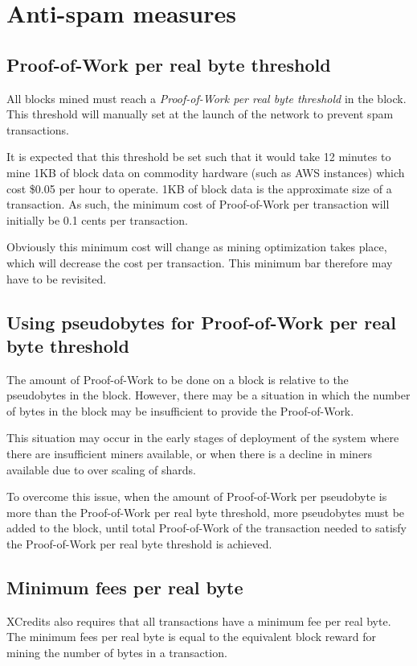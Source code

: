 \documentclass[a4paper,12pt]{article}
\begin{document}
\section{Anti-spam measures}
\subsection{Proof-of-Work per real byte threshold}
All blocks mined must reach a \textit{Proof-of-Work per real byte threshold} in the block. This threshold will manually set at the launch of the network to prevent spam transactions. 

It is expected that this threshold be set such that it would take 12 minutes to mine 1KB of block data on commodity hardware (such as AWS instances) which cost \$0.05 per hour to operate. 1KB of block data is the approximate size of a transaction. As such, the minimum cost of Proof-of-Work per transaction will initially be 0.1 cents per transaction. 

Obviously this minimum cost will change as mining optimization takes place, which will decrease the cost per transaction. This minimum bar therefore may have to be revisited.


\subsection{Using pseudobytes for Proof-of-Work per real byte threshold}
The amount of Proof-of-Work to be done on a block is relative to the pseudobytes in the block. However, there may be a situation in which the number of bytes in the block may be insufficient to provide the Proof-of-Work. 

This situation may occur in the early stages of deployment of the system where there are insufficient miners available, or when there is a decline in miners available due to over scaling of shards. 

To overcome this issue, when the amount of Proof-of-Work per pseudobyte is more than the Proof-of-Work per real byte threshold, more pseudobytes must be added to the block, until total Proof-of-Work of the transaction needed to satisfy the Proof-of-Work per real byte threshold is achieved.


\subsection{Minimum fees per real byte}
XCredits also requires that all transactions have a minimum fee per real byte. The minimum fees per real byte is equal to the equivalent block reward for mining the number of bytes in a transaction. 
\end{document}
